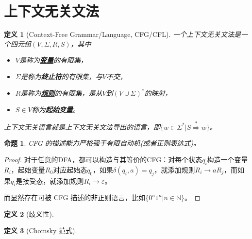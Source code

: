 \documentclass[8pt]{article}
\theoremstyle{compact}
\newtheorem{definition}{定义}
\newtheorem{proposition}{命题}
\def\obj#1{\textbf{\uline{#1}}}
\begin{document}
\section{上下文无关文法}
\begin{definition}[Context-Free Grammar/Language, CFG/CFL]
	一个上下文无关文法是一个四元组$(V, \Sigma, R, S)$，其中
	\begin{itemize}
		\item $V$是称为\obj{变量}的有限集，
		\item $\Sigma$是称为\obj{终止符}的有限集，与$V$不交，
		\item $R$是称为\obj{规则}的有限集，是从$V$到$(V \cup \Sigma)^*$的映射，
		\item $S \in V$称为\obj{起始变量}。
	\end{itemize}

	上下文无关语言就是上下文无关文法导出的语言，即$\{w \in \Sigma^* | S \overset{*}{\Rightarrow} w\}$。
\end{definition}
\begin{proposition}
	CFG 的描述能力严格强于有限自动机(或者正则表达式)。
\end{proposition}
\begin{proof}
	对于任意的DFA，都可以构造与其等价的CFG：对每个状态$q_i$构造一个变量$R_i$，起始变量$R_0$对应起始态$q_0$，如果$\delta(q_i, a) = q_j$，就添加规则$R_i \to aR_j$，而如果$q_i$是接受态，就添加规则$R_i \to \varepsilon$。

	而显然存在可被 CFG 描述的非正则语言，比如$\{0^n1^n | n \in \mathbb N\}$。
\end{proof}
\begin{definition}[歧义性]
	
\end{definition}
\begin{definition}[Chomsky 范式]
	
\end{definition}
\end{document}

